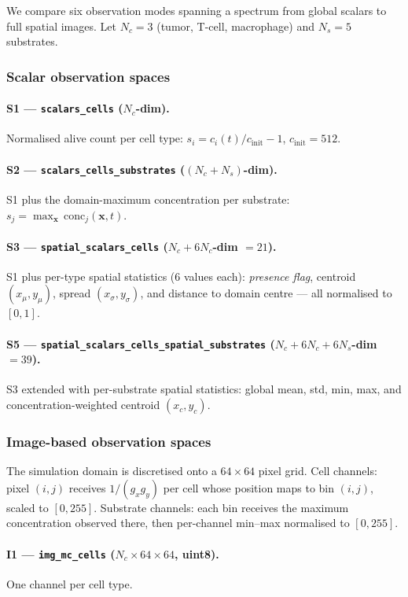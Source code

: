 \documentclass{article}
\newcommand{\Ione}{\texttt{img\_mc\_cells}}
\newcommand{\Sone}{\texttt{scalars\_cells}}
\newcommand{\Stwo}{\texttt{scalars\_cells\_substrates}}
\newcommand{\Sthree}{\texttt{spatial\_scalars\_cells}}
\newcommand{\Sfive}{\texttt{spatial\_scalars\_cells\_spatial\_substrates}}
\begin{document}
We compare six observation modes spanning a spectrum from global scalars to
full spatial images.
Let $N_c=3$ (tumor, T-cell, macrophage) and $N_s=5$ substrates.

\subsubsection*{Scalar observation spaces}

\paragraph{S1 — \Sone{} ($N_c$-dim).}
Normalised alive count per cell type:
$s_i = c_i(t)/c_{\text{init}} - 1$, $c_{\text{init}}=512$.

\paragraph{S2 — \Stwo{} ($(N_c\!+\!N_s)$-dim).}
S1 plus the domain-maximum concentration per substrate:
$s_j = \max_\mathbf{x}\,\mathrm{conc}_j(\mathbf{x},t)$.

\paragraph{S3 — \Sthree{} ($N_c + 6N_c$-dim $=21$).}
S1 plus per-type spatial statistics (6 values each):
\emph{presence flag}, centroid $(x_\mu, y_\mu)$, spread $(x_\sigma, y_\sigma)$,
and distance to domain centre — all normalised to $[0,1]$.

\paragraph{S5 — \Sfive{} ($N_c + 6N_c + 6N_s$-dim $=39$).}
S3 extended with per-substrate spatial statistics:
global mean, std, min, max, and concentration-weighted centroid $(x_c, y_c)$.

\subsubsection*{Image-based observation spaces}

The simulation domain is discretised onto a $64\!\times\!64$ pixel grid.
Cell channels: pixel $(i,j)$ receives $1/(g_xg_y)$ per cell whose position
maps to bin $(i,j)$, scaled to $[0,255]$.
Substrate channels: each bin receives the maximum concentration observed
there, then per-channel min–max normalised to $[0,255]$.

\paragraph{I1 — \Ione{} ($N_c\!\times\!64\!\times\!64$, uint8).}
One channel per cell type.
\end{document}
